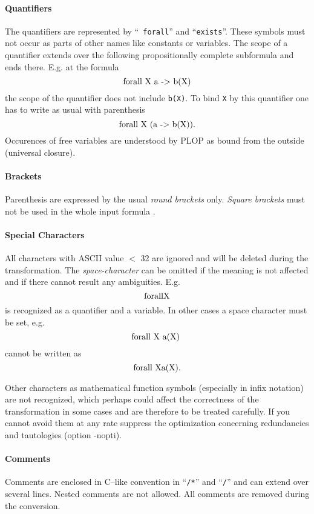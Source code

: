 \paragraph{Quantifiers}
The quantifiers are represented by
``{\tt
forall}'' and ``{\tt exists}''.
These symbols must not occur as parts of other names like constants
or variables.
The scope of a quantifier extends over the following propositionally 
complete subformula and ends there.
E.g. at the formula
\[\tt 
\mbox{forall X a -> b(X)}  \\
\rm
\]
the scope of the quantifier does not include {\tt b(X)}.
To bind {\tt X} by this quantifier one has to write as usual with parenthesis
\[\tt 
\mbox{forall X (a -> b(X)).}\\
\rm
\]
Occurences of free variables are understood by PLOP as bound
from the outside (universal closure).

\paragraph{Brackets}
Parenthesis are expressed by the usual {\em round brackets} only.
{\em Square brackets} must not be used in the whole input formula .

\paragraph{Special Characters}
All characters with ASCII value $<$ 32 are ignored and will be deleted
during the transformation.
The {\em space-character} can be omitted if the meaning is not affected and if
there cannot result any ambiguities. 
E.g. 
\[\tt 
\mbox{forallX} \\
\rm
\]
is recognized as a quantifier and a variable. 
In other cases a space character must be set, e.g.
\[\tt 
\mbox{forall X a(X) }\\
\rm
\]
cannot be written as 
\[ \tt 
\mbox{forall Xa(X).}\\
\rm
\]


Other characters as mathematical function symbols (especially in
infix notation) are not recognized, which perhaps could affect the
correctness of the transformation in some cases and are therefore to 
be treated carefully. 
If you cannot avoid 
them at any rate suppress the optimization concerning redundancies
and tautologies (option -nopti). 

\paragraph{Comments}
Comments are enclosed in C--like convention in ``{\tt /*}'' and ``{\tt */}''
and can extend over several lines. Nested comments are not allowed.
All comments are removed during the conversion.

